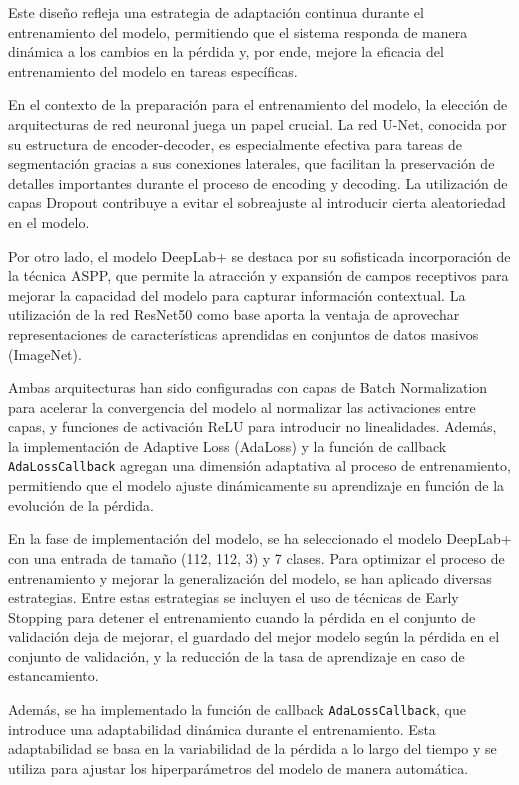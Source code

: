 \documentclass[runningheads]{llncs}
\begin{document}
Este diseño refleja una estrategia de adaptación continua durante el entrenamiento del modelo, permitiendo que el sistema responda de manera dinámica a los cambios en la pérdida y, por ende, mejore la eficacia del entrenamiento del modelo en tareas específicas.

En el contexto de la preparación para el entrenamiento del modelo, la elección de arquitecturas de red neuronal juega un papel crucial. La red U-Net, conocida por su estructura de encoder-decoder, es especialmente efectiva para tareas de segmentación gracias a sus conexiones laterales, que facilitan la preservación de detalles importantes durante el proceso de encoding y decoding. La utilización de capas Dropout contribuye a evitar el sobreajuste al introducir cierta aleatoriedad en el modelo.

Por otro lado, el modelo DeepLab+ se destaca por su sofisticada incorporación de la técnica ASPP, que permite la atracción y expansión de campos receptivos para mejorar la capacidad del modelo para capturar información contextual. La utilización de la red ResNet50 como base aporta la ventaja de aprovechar representaciones de características aprendidas en conjuntos de datos masivos (ImageNet).

Ambas arquitecturas han sido configuradas con capas de Batch Normalization para acelerar la convergencia del modelo al normalizar las activaciones entre capas, y funciones de activación ReLU para introducir no linealidades. Además, la implementación de Adaptive Loss (AdaLoss) y la función de callback \verb|AdaLossCallback| agregan una dimensión adaptativa al proceso de entrenamiento, permitiendo que el modelo ajuste dinámicamente su aprendizaje en función de la evolución de la pérdida.

 En la fase de implementación del modelo, se ha seleccionado el modelo DeepLab+ con una entrada de tamaño (112, 112, 3) y 7 clases. Para optimizar el proceso de entrenamiento y mejorar la generalización del modelo, se han aplicado diversas estrategias. Entre estas estrategias se incluyen el uso de técnicas de Early Stopping para detener el entrenamiento cuando la pérdida en el conjunto de validación deja de mejorar, el guardado del mejor modelo según la pérdida en el conjunto de validación, y la reducción de la tasa de aprendizaje en caso de estancamiento.

Además, se ha implementado la función de callback \verb|AdaLossCallback|, que introduce una adaptabilidad dinámica durante el entrenamiento. Esta adaptabilidad se basa en la variabilidad de la pérdida a lo largo del tiempo y se utiliza para ajustar los hiperparámetros del modelo de manera automática.
\end{document}
